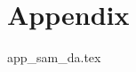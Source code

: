 \documentclass[
    10pt,
	colorful,
	boxey,
 a4paper,
]{tufte-style-thesis}
\begin{document}
\part*{Appendix}
\appendix

\setcounter{table}{0}
\setcounter{figure}{0}
\setcounter{section}{0}

\renewcommand{\thetable}{A\arabic{table}}  %
\renewcommand{\thefigure}{A\arabic{figure}}  %
\renewcommand{\thechapter}{\Alph{chapter}}
\renewcommand{\thesection}{\Alph{section}}

{app_sam_da.tex}

\cleardoublepage


\begin{wide}
\thispagestyle{empty}
\printindex
\end{wide}
\end{document}
